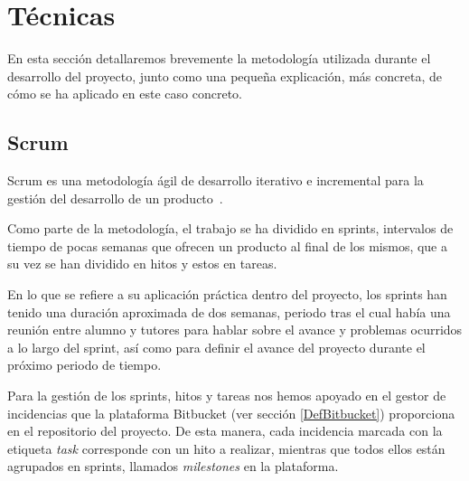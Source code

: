 

\section{Técnicas}
En esta sección detallaremos brevemente la metodología utilizada durante el desarrollo del proyecto, junto como una pequeña explicación, más concreta, de cómo se ha aplicado en este caso concreto.
\subsection{Scrum}

Scrum es una metodología ágil de desarrollo iterativo e incremental para la gestión del desarrollo de un producto~\cite{wikiScrum}. 

Como parte de la metodología, el trabajo se ha dividido en sprints, intervalos de tiempo de pocas semanas que ofrecen un producto al final de los mismos, que a su vez se han dividido en hitos y estos en tareas.

En lo que se refiere a su aplicación práctica dentro del proyecto, los sprints han tenido una duración aproximada de dos semanas, periodo tras el cual había una reunión entre alumno y tutores para hablar sobre el avance y problemas ocurridos a lo largo del sprint, así como para definir el avance del proyecto durante el próximo periodo de tiempo.

Para la gestión de los sprints, hitos y tareas nos hemos apoyado en el gestor de incidencias que la plataforma Bitbucket (ver sección \ref{DefBitbucket}) proporciona en el repositorio del proyecto. De esta manera, cada incidencia marcada con la etiqueta \textit{task} corresponde con un hito a realizar, mientras que todos ellos están agrupados en sprints, llamados \textit{milestones} en la plataforma.

